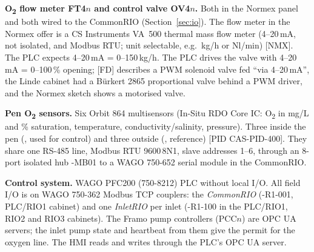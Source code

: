 \documentclass[11pt,a4paper]{article}
\newcommand{\Otwo}{O\textsubscript{2}}
\begin{document}
\textbf{\Otwo{} flow meter FT4$n$ and control valve OV4$n$.} Both in the Normex panel and
both wired to the CommonRIO (Section~\ref{sec:io}). The flow meter in the Normex offer is a CS
Instruments VA~500 thermal mass flow meter (4--20\,mA, not isolated, and Modbus RTU; unit
selectable, e.g.\ kg/h or Nl/min) [NMX]. The PLC expects 4--20\,mA = 0--150\,kg/h. The
PLC drives the valve with 4--20\,mA = 0--100\,\% opening; [FD] describes a PWM solenoid valve fed
``via 4--20\,mA'', the Linde cabinet had a Bürkert 2865 proportional valve behind a PWM driver,
and the Normex sketch shows a motorised valve.

\textbf{Pen \Otwo{} sensors.} Six Orbit 864 multisensors (In-Situ RDO Core IC: \Otwo{} in mg/L and
\% saturation, temperature, conductivity/salinity, pressure). Three inside the pen
(, used for control) and three outside (, reference) [PID CAS-PID-400].
They share one RS-485 line, Modbus RTU 9600\,8N1, slave addresses 1--6, through an 8-port
isolated hub -MB01 to a WAGO 750-652 serial module in the CommonRIO.

\textbf{Control system.} WAGO PFC200 (750-8212) PLC without local I/O. All field I/O is on
WAGO 750-362 Modbus TCP couplers: the \emph{CommonRIO} (-R1-001, PLC/RIO1 cabinet) and one
\emph{InletRIO} per inlet (-R1-100 in the PLC/RIO1, RIO2 and RIO3 cabinets). The Framo pump
controllers (PCC$n$) are OPC UA servers; the inlet pump state and heartbeat from them give the
permit for the oxygen line. The HMI reads and writes  through the PLC's OPC UA server.
\end{document}
